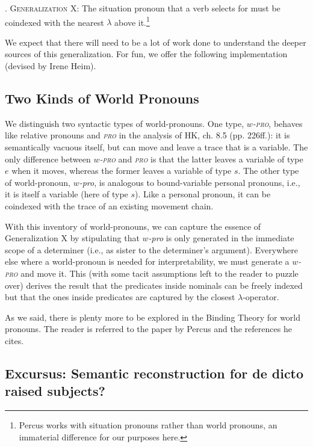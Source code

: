 \ex. \textsc{Generalization X}: The situation pronoun that a verb selects for must be coindexed with the nearest $\lambda$ above it.\footnote{Percus works with situation pronouns rather than world pronouns, an immaterial difference for our purposes here.}

We expect that there will need to be a lot of work done to understand the deeper sources of this generalization. For fun, we offer the following implementation (devised by Irene Heim).

\subsection{Two Kinds of World Pronouns}

We distinguish two syntactic types of world-pronouns. One type, \emph{$w$-\textsc{pro}}, behaves like relative pronouns and \emph{\textsc{pro}} in the analysis of H\amp K, ch. 8.5 (pp. 226ff.): it is semantically vacuous itself, but can move and leave a trace that is a variable. The only difference between \emph{$w$-\textsc{pro}} and \emph{\textsc{pro}} is that the latter leaves a variable of type $e$ when it moves, whereas the former leaves a variable of type $s$. The other type of world-pronoun, \emph{$w$-pro}, is analogous to bound-variable personal pronouns, i.e., it is itself a variable (here of type $s$). Like a personal pronoun, it can be coindexed with the trace of an existing movement chain.

With this inventory of world-pronouns, we can capture the essence of Generalization X by stipulating that \emph{$w$-pro} is only generated in the immediate scope of a determiner (i.e., as sister to the determiner's argument). Everywhere else where a world-pronoun is needed for interpretability, we must generate a \emph{$w$-\textsc{pro}} and move it. This (with some tacit assumptions left to the reader to puzzle over) derives the result that the predicates inside nominals can be freely indexed but that the ones inside predicates are captured by the closest $\lambda$-operator.

As we said, there is plenty more to be explored in the Binding Theory for world pronouns. The reader is referred to the paper by Percus and the references he cites.

\subsection{Excursus: Semantic reconstruction for de dicto raised subjects?}

